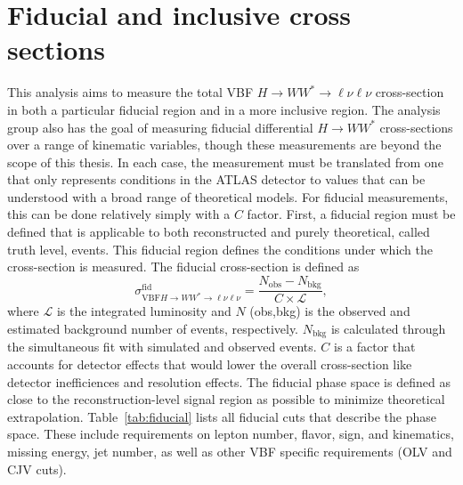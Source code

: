 \section{Fiducial and inclusive cross sections}
This analysis aims to measure the total VBF $H\rightarrow WW^*\rightarrow\ell\nu\ell\nu$ cross-section in both a particular fiducial region and in a more inclusive region. The analysis group also has the goal of measuring fiducial differential $H\rightarrow WW^*$ cross-sections over a range of kinematic variables, though these measurements are beyond the scope of this thesis. In each case, the measurement must be translated from one that only represents conditions in the ATLAS detector to values that can be understood with a broad range of theoretical models. For fiducial measurements, this can be done relatively simply with a $C$ factor. First, a fiducial region must be defined that is applicable to both reconstructed and purely theoretical, called truth level, events. This fiducial region defines the conditions under which the cross-section is measured. The fiducial cross-section is defined as
\begin{equation}
\sigma_{\text{VBF}H\rightarrow WW^*\rightarrow\ell\nu\ell\nu}^{\text{fid}} = \frac{N_{\text{obs}}-N_{\text{bkg}}}{C\times\mathcal{L}},
\end{equation} 
where $\mathcal{L}$ is the integrated luminosity and $N$ (obs,bkg) is the observed and estimated background number of events, respectively. $N_{\text{bkg}}$ is calculated through the simultaneous fit with simulated and observed events. $C$ is a factor that accounts for detector effects that would lower the overall cross-section like detector inefficiences and resolution effects. The fiducial phase space is defined as close to the reconstruction-level signal region as possible to minimize theoretical extrapolation. Table~\ref{tab:fiducial} lists all fiducial cuts that describe the phase space. These include requirements on lepton number, flavor, sign, and kinematics, missing energy, jet number, as well as other VBF specific requirements (OLV and CJV cuts). 
